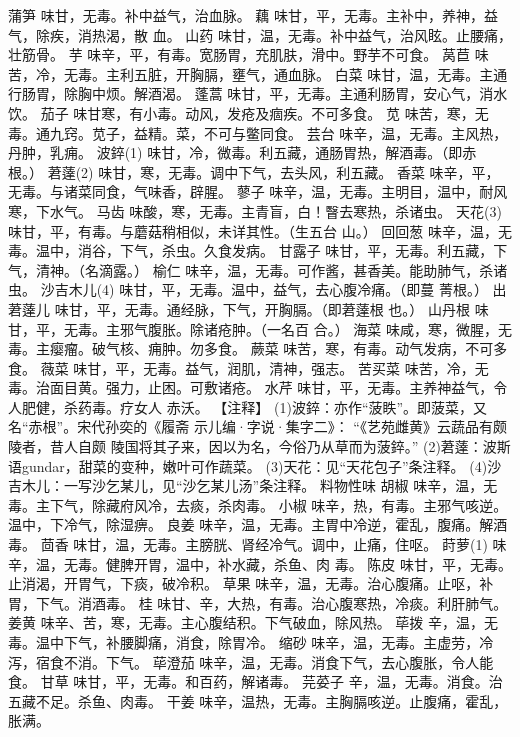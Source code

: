 \documentclass[12pt,UTF8]{ctexbook}
\begin{document}
蒲笋 味甘，无毒。补中益气，治血脉。
藕 味甘，平，无毒。主补中，养神，益气，除疾，消热渴，散
血。
山药 味甘，温，无毒。补中益气，治风眩。止腰痛，壮筋骨。
芋 味辛，平，有毒。宽肠胃，充肌肤，滑中。野芋不可食。
莴苣 味苦，冷，无毒。主利五脏，开胸膈，壅气，通血脉。
白菜 味甘，温，无毒。主通行肠胃，除胸中烦。解酒渴。
蓬蒿 味甘，平，无毒。主通利肠胃，安心气，消水饮。
茄子 味甘寒，有小毒。动风，发疮及痼疾。不可多食。
苋 味苦，寒，无毒。通九窍。苋子，益精。菜，不可与鳖同食。
芸台 味辛，温，无毒。主风热，丹肿，乳痈。
波錊(1) 味甘，冷，微毒。利五藏，通肠胃热，解酒毒。（即赤
根。）
莙薘(2) 味甘，寒，无毒。调中下气，去头风，利五藏。
香菜 味辛，平，无毒。与诸菜同食，气味香，辟腥。
蓼子 味辛，温，无毒。主明目，温中，耐风寒，下水气。
马齿 味酸，寒，无毒。主青盲，白！瞖去寒热，杀诸虫。
天花(3) 味甘，平，有毒。与蘑菇稍相似，未详其性。（生五台
山。）
回回葱 味辛，温，无毒。温中，消谷，下气，杀虫。久食发病。
甘露子 味甘，平，无毒。利五藏，下气，清神。（名滴露。）
榆仁 味辛，温，无毒。可作酱，甚香美。能助肺气，杀诸虫。
沙吉木儿(4) 味甘，平，无毒。温中，益气，去心腹冷痛。（即蔓
菁根。）
出莙薘儿 味甘，平，无毒。通经脉，下气，开胸膈。（即莙薘根
也。）
山丹根 味甘，平，无毒。主邪气腹胀。除诸疮肿。（一名百
合。）
海菜 味咸，寒，微腥，无毒。主瘿瘤。破气核、痈肿。勿多食。
蕨菜 味苦，寒，有毒。动气发病，不可多食。
薇菜 味甘，平，无毒。益气，润肌，清神，强志。
苦买菜 味苦，冷，无毒。治面目黄。强力，止困。可敷诸疮。
水芹 味甘，平，无毒。主养神益气，令人肥健，杀药毒。疗女人
赤沃。
【注释】
(1)波錊：亦作“菠眣”。即菠菜，又名“赤根”。宋代孙奕的《履斋
示儿编·字说·集字二》：
“《艺苑雌黄》云蔬品有颇陵者，昔人自颇
陵国将其子来，因以为名，今俗乃从草而为菠錊。”
(2)莙薘：波斯语gundar，甜菜的变种，嫩叶可作蔬菜。
(3)天花：见“天花包子”条注释。
(4)沙吉木儿：一写沙乞某儿，见“沙乞某儿汤”条注释。
料物性味
胡椒 味辛，温，无毒。主下气，除藏府风冷，去痰，杀肉毒。
小椒 味辛，热，有毒。主邪气咳逆。温中，下冷气，除湿痹。
良姜 味辛，温，无毒。主胃中冷逆，霍乱，腹痛。解酒毒。
茴香 味甘，温，无毒。主膀胱、肾经冷气。调中，止痛，住呕。
莳萝(1) 味辛，温，无毒。健脾开胃，温中，补水藏，杀鱼、肉
毒。
陈皮 味甘，平，无毒。止消渴，开胃气，下痰，破冷积。
草果 味辛，温，无毒。治心腹痛。止呕，补胃，下气。消酒毒。
桂 味甘、辛，大热，有毒。治心腹寒热，冷痰。利肝肺气。
姜黄 味辛、苦，寒，无毒。主心腹结积。下气破血，除风热。
荜拨 辛，温，无毒。温中下气，补腰脚痛，消食，除胃冷。
缩砂 味辛，温，无毒。主虚劳，冷泻，宿食不消。下气。
荜澄茄 味辛，温，无毒。消食下气，去心腹胀，令人能食。
甘草 味甘，平，无毒。和百药，解诸毒。
芫荽子 辛，温，无毒。消食。治五藏不足。杀鱼、肉毒。
干姜 味辛，温热，无毒。主胸膈咳逆。止腹痛，霍乱，胀满。
\end{document}
